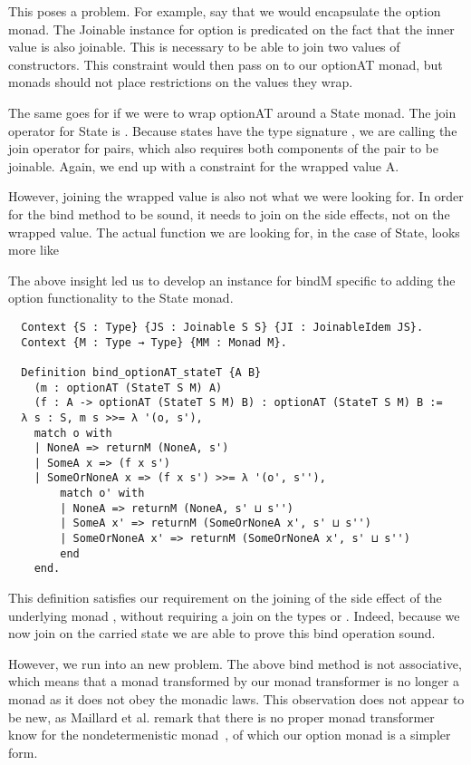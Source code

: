 This poses a problem. For example, say that we would encapsulate the option
monad. The Joinable instance for option is predicated on the fact that the inner
value  is also joinable. This is necessary to be able to join two values of
 constructors. This constraint would then pass on to our optionAT
monad, but monads should not place restrictions on the values they wrap.

The same goes for if we were to wrap optionAT around a State monad. The join
operator for State is 
.
Because states have the type signature , we are calling the
join operator for pairs, which also requires both components of the pair to be
joinable. Again, we end up with a constraint for the wrapped value A.

However, joining the wrapped value is also not what we were looking for. In
order for the bind method to be sound, it needs to join on the side effects,
not on the wrapped value. The actual function we are looking for, in the case
of State, looks more like 

The above insight led us to develop an instance for bindM specific to adding
the option functionality to the State monad.

\begin{verbatim}
  Context {S : Type} {JS : Joinable S S} {JI : JoinableIdem JS}.
  Context {M : Type → Type} {MM : Monad M}.

  Definition bind_optionAT_stateT {A B} 
    (m : optionAT (StateT S M) A)
    (f : A -> optionAT (StateT S M) B) : optionAT (StateT S M) B :=
  λ s : S, m s >>= λ '(o, s'),
    match o with
    | NoneA => returnM (NoneA, s')
    | SomeA x => (f x s')
    | SomeOrNoneA x => (f x s') >>= λ '(o', s''),
        match o' with 
        | NoneA => returnM (NoneA, s' ⊔ s'')
        | SomeA x' => returnM (SomeOrNoneA x', s' ⊔ s'')
        | SomeOrNoneA x' => returnM (SomeOrNoneA x', s' ⊔ s'')
        end
    end.
\end{verbatim}

This definition satisfies our requirement on the joining of the side effect
of the underlying monad , without requiring a join on the
types  or . Indeed, because we now join on the carried state we
are able to prove this bind operation sound.

However, we run into an new problem. The above bind method is not associative,
which means that a monad transformed by our  monad transformer
is no longer a monad as it does not obey the monadic laws. This observation
does not appear to be new, as Maillard et al. remark that there is no proper
monad transformer know for the nondetermenistic
monad~\cite{maillard2019dijkstra}, of which our option
monad is a simpler form.

